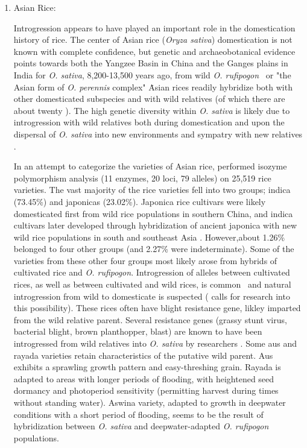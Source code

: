 \documentclass[11pt]{article}
\begin{document}
\begin{enumerate}
\begin{enumerate}
\item{Asian Rice:}




Introgression appears to have played an important role in the domestication history of rice.
The center of Asian rice (\emph{Oryza sativa}) domestication is not known with complete confidence, but genetic and archaeobotanical evidence points towards both the Yangzee Basin in China and the Ganges plains in India for \emph{O. sativa}, 8,200-13,500 years ago, from wild \emph{O. rufipogon}  \cite{oka2012origin, fuller2010consilience, ricepedia, molina2011molecular}\ or "the Asian form of \emph{O. perennis} complex" \cite{oka2012origin}\.
Asian rices readily hybridize both with other domesticated subspecies and with wild relatives (of which there are about twenty \cite{ricepedia}).
The high genetic diversity within \emph{O. sativa} is likely due to introgression with wild relatives both during domestication and upon the dispersal of \emph{O. sativa} into new environments and sympatry with new relatives \cite{second1982origin}.

In an attempt to categorize the varieties of Asian rice, \cite{khush2003classifying} performed isozyme polymorphism analysis (11 enzymes, 20 loci, 79 alleles) on 25,519 rice varieties.
The vast majority of the rice varieties fell into two groups; indica (73.45\%) and japonicas (23.02\%).
Japonica rice cultivars were likely domesticated first from wild rice populations in southern China, and indica cultivars later developed through hybridization of ancient japonica with new wild rice populations in south and southeast Asia \cite{Huang2012, londo2006phylogeography}.
However,about 1.26\% belonged to four other groups (and 2.27\% were indeterminate).
Some of the varieties from these other four groups most likely arose from hybrids of cultivated rice and \emph{O. rufipogon}.
Introgression of alleles between cultivated rices, as well as between cultivated and wild rices, is common \cite{oka2012origin, second1982origin, zhao2010genomic}\, and natural introgression from wild to domesticate is suspected (\cite{zhao2010genomic} calls for research into this possibility).
These rices often have blight resistance gene, likley imparted from the wild relative parent.
Several resistance genes (grassy stunt virus, bacterial blight, brown planthopper, blast) are known to have been introgressed from wild relatives into \emph{O. sativa} by researchers \cite{brar1997alien, khush1974inheritance}.
Some aus and rayada varieties retain characteristics of the putative wild parent.
Aus exhibits a sprawling growth pattern and easy-threshing grain.
Rayada is adapted to areas with longer periods of flooding, with heightened seed dormancy and photoperiod sensitivity (permitting harvest during times without standing water).
Aswina variety, adapted to growth in deepwater conditions with a short period of flooding, seems to be the result of hybridization between \emph{O. sativa} and deepwater-adapted \emph{O. rufipogon} populations.


\end{enumerate}
\end{enumerate}
\end{document}
